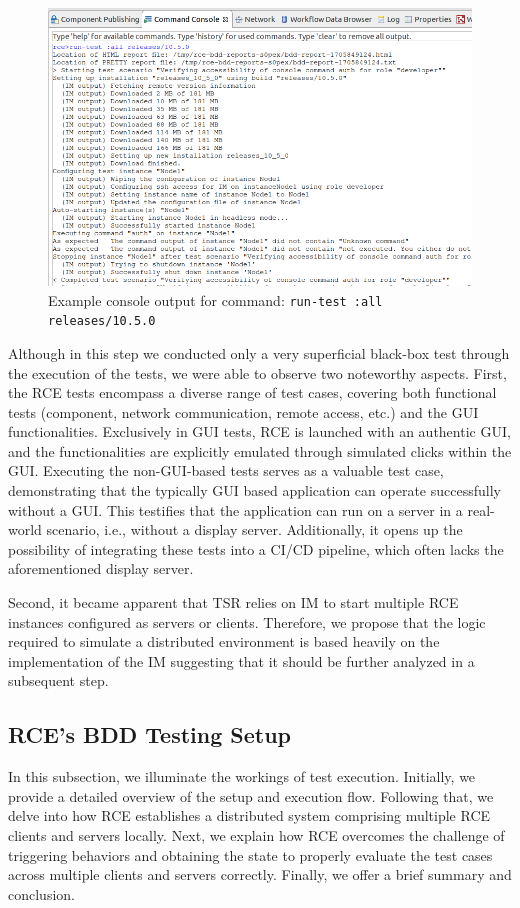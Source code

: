 \begin{figure}[!ht]
    \centering
    \includegraphics[width=\linewidth]{files/figures/rce-execute-tests.png}
    \caption{Example console output for command: \texttt{run-test :all releases/10.5.0}}
    \label{fig:rce-test-output}
\end{figure}


Although in this step we conducted only a very superficial black-box test through the execution of the tests, we were able to observe two noteworthy aspects. First, the \ac{RCE} tests encompass a diverse range of test cases, covering both functional tests (component, network communication, remote access, etc.) and the \ac{GUI} functionalities. Exclusively in \ac{GUI} tests, \ac{RCE} is launched with an authentic \ac{GUI}, and the functionalities are explicitly emulated through simulated clicks within the \ac{GUI}.
Executing the non-\acs{GUI}-based tests serves as a valuable test case, demonstrating that the typically \acs{GUI} based application can operate successfully without a \acs{GUI}. This testifies that the application can run on a server in a real-world scenario, i.e., without a display server. Additionally, it opens up the possibility of integrating these tests into a CI/CD pipeline, which often lacks the aforementioned display server.

Second, it became apparent that \ac{TSR} relies on \ac{IM} to start multiple \ac{RCE} instances configured as servers or clients. Therefore, we propose that the logic required to simulate a distributed environment is based heavily on the implementation of the \ac{IM} suggesting that it should be further analyzed in a subsequent step.

\subsection{\ac{RCE}'s BDD Testing Setup}
\label{subsec:BuiltinBDDTest}
In this subsection, we illuminate the workings of test execution. Initially, we provide a detailed overview of the setup and execution flow. Following that, we delve into how \ac{RCE} establishes a distributed system comprising multiple \ac{RCE} clients and servers locally. Next, we explain how \ac{RCE} overcomes the challenge of triggering behaviors and obtaining the state to properly evaluate the test cases across multiple clients and servers correctly. Finally, we offer a brief summary and conclusion.

